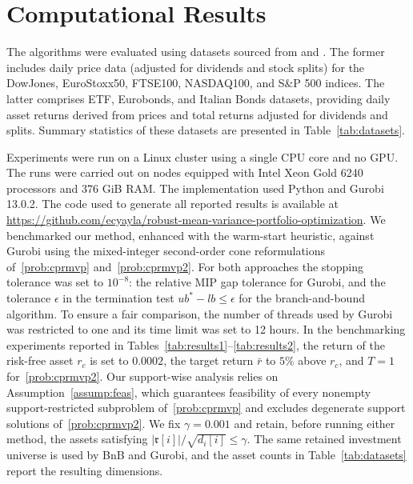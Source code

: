 \documentclass[11pt]{article}
\theoremstyle{plain}
\theoremstyle{definition}
\theoremstyle{plain}
\newcommand{\abs}[1]{\left\lvert#1\right\rvert}
\newcommand{\ccr}{{\mathfrak r}}
\begin{document}
\section{Computational Results}\label{computation}
The algorithms were evaluated using datasets sourced from \cite{CesaroneEtal2025} and \cite{AraratEtal2024}. The former includes daily price data (adjusted for dividends and stock splits) for the DowJones, EuroStoxx50, FTSE100, NASDAQ100, and S\&P 500 indices. The latter comprises ETF, Eurobonds, and Italian Bonds datasets, providing daily asset returns derived from prices and total returns adjusted for dividends and splits. Summary statistics of these datasets are presented in Table~\ref{tab:datasets}.

Experiments were run on a Linux cluster using a single CPU core and no GPU. The runs were carried out on nodes equipped with Intel Xeon Gold 6240 processors and 376 GiB RAM. The implementation used Python and Gurobi 13.0.2. The code used to generate all reported results is available at \url{https://github.com/ecyayla/robust-mean-variance-portfolio-optimization}. We benchmarked our method, enhanced with the warm-start heuristic, against Gurobi using the mixed-integer second-order cone reformulations of~\eqref{prob:cprmvp} and~\eqref{prob:cprmvp2}. For both approaches the stopping tolerance was set to $10^{-8}$: the relative MIP gap tolerance for Gurobi, and the tolerance $\epsilon$ in the termination test $ub^*-lb\leq\epsilon$ for the branch-and-bound algorithm. To ensure a fair comparison, the number of threads used by Gurobi was restricted to one and its time limit was set to 12 hours. In the benchmarking experiments reported in Tables~\ref{tab:results1}--\ref{tab:results2}, the return of the risk-free asset $r_c$ is set to $0.0002$, the target return $\bar{r}$ to $5\%$ above $r_c$, and $T=1$ for~\eqref{prob:cprmvp2}. Our support-wise analysis relies on Assumption~\ref{assump:feas}, which guarantees feasibility of every nonempty support-restricted subproblem of~\eqref{prob:cprmvp} and excludes degenerate support solutions of~\eqref{prob:cprmvp2}. We fix $\gamma=0.001$ and retain, before running either method, the assets satisfying $\abs{\ccr[i]}/\sqrt{d_i[i]}\leq\gamma$. The same retained investment universe is used by BnB and Gurobi, and the asset counts in Table~\ref{tab:datasets} report the resulting dimensions.
\end{document}
